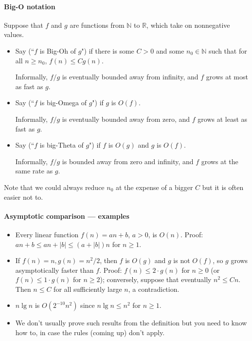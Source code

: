 \paragraph{Big-O notation}
\begin{Definition}

Suppose that $f$ and $g$ are functions from $\mathbb{N}$ to $\mathbb{R}$, 
which take on nonnegative values. 
\begin{itemize}
\item Say  (``$f$ is Big-Oh of $g$") if there is
some $C > 0$ and some $n_0 \in \mathbb{N}$ such that for all $n \geq
n_0$, $f(n) \leq C g(n)$. 

Informally, $f/g$ is eventually bounded away from infinity, and $f$ grows at most as fast as $g$.

\item Say  (``$f$ is big-Omega of $g$") if $g$ is
$O(f)$. 

Informally, $f/g$ is eventually bounded away from zero, and $f$ grows at least as fast as $g$.
\item Say  (``$f$ is big-Theta of $g$") if $f$ is 
$O(g)$ and $g$ is $O(f)$. 

Informally, $f/g$ is bounded away from zero and infinity, and $f$ grows at the same rate as $g$.
\end{itemize}
\end{Definition}

Note that we could always reduce $n_0$ at the expense of a bigger $C$ but 
it is often easier not to. 

\paragraph{Asymptotic comparison --- examples}
\begin{itemize}
\item Every linear function $f(n) = an + b$, $a > 0$, is $O(n)$. Proof: 
$an + b \leq an + |b| \leq (a + |b|) n$ for $n \geq 1$. 
\item If $f(n) = n, g(n) = n^2/2$, then $f$ is $O(g)$ and $g$ is not
$O(f)$, so $g$ grows asymptotically faster than $f$. Proof: 
$f(n) \leq 2 \cdot g(n)$ for $n\geq 0$ (or $f(n) \leq 1 \cdot g(n)$ for 
$n \geq 2$); conversely, suppose 
that eventually $n^2 \leq Cn$. Then $n \leq C$ for all sufficiently large $n$, 
a contradiction.
\item $n \lg n$ is $O(2^{-10} n^2)$ since $n \lg n \leq n^2$ for $n \geq 1$.
\item We don't usually prove such results from the definition but you
need to know how to, in case the rules (coming up) don't apply.
\end{itemize}


